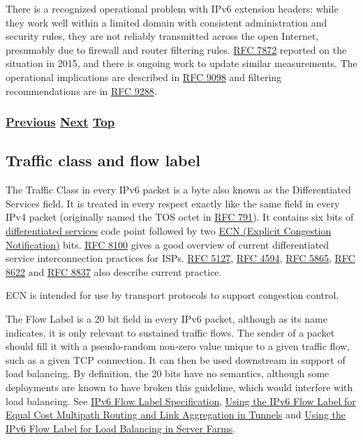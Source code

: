 \documentclass[
]{article}
\begin{document}
There is a recognized operational problem with IPv6 extension headers:
while they work well within a limited domain with consistent
administration and security rules, they are not reliably transmitted
across the open Internet, presumably due to firewall and router
filtering rules. \href{https://www.rfc-editor.org/info/rfc7872}{RFC
7872} reported on the situation in 2015, and there is ongoing work to
update similar measurements. The operational implications are described
in \href{https://www.rfc-editor.org/info/rfc9098}{RFC 9098} and
filtering recommendations are in
\href{https://www.rfc-editor.org/info/rfc9288}{RFC 9288}.

\subsubsection{\texorpdfstring{\hyperref[transport-protocols]{Previous}
\hyperref[traffic-class-and-flow-label]{Next}
\hyperref[ipv6-basic-technology]{Top}}{Previous Next Top}}\label{previous-next-top-17}

\pagebreak

\subsection{Traffic class and flow
label}\label{traffic-class-and-flow-label}

The Traffic Class in every IPv6 packet is a byte also known as the
Differentiated Services field. It is treated in every respect exactly
like the same field in every IPv4 packet (originally named the TOS octet
in \href{https://www.rfc-editor.org/info/rfc791}{RFC 791}). It contains
six bits of
\href{https://www.rfc-editor.org/info/rfc2474}{differentiated services}
code point followed by two
\href{https://www.rfc-editor.org/info/rfc3168}{ECN (Explicit Congestion
Notification)} bits. \href{https://www.rfc-editor.org/info/rfc8100}{RFC
8100} gives a good overview of current differentiated service
interconnection practices for ISPs.
\href{https://www.rfc-editor.org/info/rfc5127}{RFC 5127},
\href{https://www.rfc-editor.org/info/rfc4594}{RFC 4594},
\href{https://www.rfc-editor.org/info/rfc5865}{RFC 5865},
\href{https://www.rfc-editor.org/info/rfc8622}{RFC 8622} and
\href{https://www.rfc-editor.org/info/rfc8837}{RFC 8837} also describe
current practice.

ECN is intended for use by transport protocols to support congestion
control.

The Flow Label is a 20 bit field in every IPv6 packet, although as its
name indicates, it is only relevant to sustained traffic flows. The
sender of a packet should fill it with a pseudo-random non-zero value
unique to a given traffic flow, such as a given TCP connection. It can
then be used downstream in support of load balancing. By definition, the
20 bits have no semantics, although some deployments are known to have
broken this guideline, which would interfere with load balancing. See
\href{https://www.rfc-editor.org/info/rfc6437}{IPv6 Flow Label
Specification}, \href{https://www.rfc-editor.org/info/rfc6438}{Using the
IPv6 Flow Label for Equal Cost Multipath Routing and Link Aggregation in
Tunnels} and \href{https://www.rfc-editor.org/info/rfc7098}{Using the
IPv6 Flow Label for Load Balancing in Server Farms}.
\end{document}
